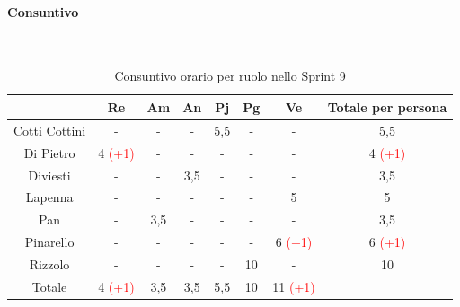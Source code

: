 \documentclass{article}
\begin{document}
                \paragraph{Consuntivo}\mbox{}\\
                \begin{table}[H]
                    \centering
                    \begin{tabular}{|c|c|c|c|c|c|c|c|}
                    \hline
                                    & Re  & Am  & An  & Pj  & Pg  & Ve  & Totale per persona \\ \hline
                    Cotti Cottini & -   & -   & -   & 5,5 & -   & -   & 5,5                \\ \hline
                    Di Pietro     & 4 \textcolor{red}{(+1)}   & -   & -   & -   & -   & -   & 4 \textcolor{red}{(+1)}                  \\ \hline
                    Diviesti      & -   & -   & 3,5 & -   & -   & -   & 3,5                \\ \hline
                    Lapenna       & -   & -   & -   & -   & -   & 5   & 5                  \\ \hline
                    Pan           & -   & 3,5 & -   & -   & -   & -   & 3,5                \\ \hline
                    Pinarello     & -   & -   & -   & -   & -   & 6 \textcolor{red}{(+1)}   & 6 \textcolor{red}{(+1)}                  \\ \hline
                    Rizzolo       & -   & -   & -   & -   & 10  & -   & 10                 \\ \hline
                    Totale        & 4 \textcolor{red}{(+1)}   & 3,5 & 3,5 & 5,5 & 10  & 11 \textcolor{red}{(+1)}  &                    \\ \hline
                    \end{tabular}
                    \caption{Consuntivo orario per ruolo nello Sprint 9}
                \end{table}

\end{document}
